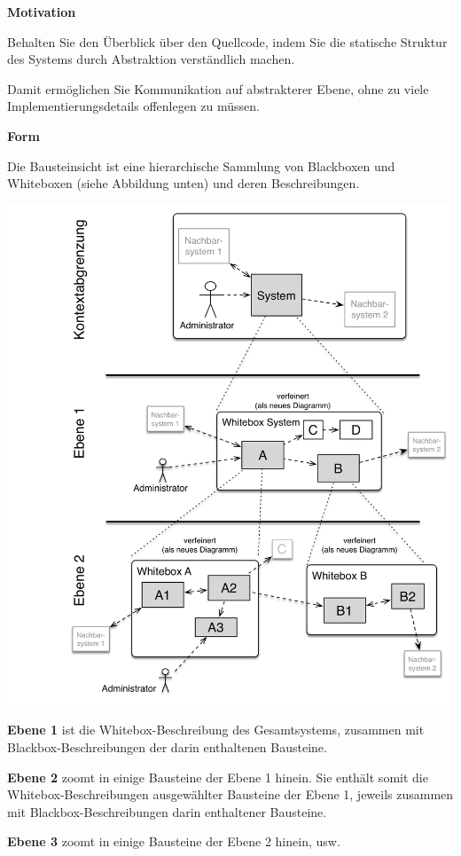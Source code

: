 \documentclass[
]{article}
\begin{document}
\textbf{Motivation}

Behalten Sie den Überblick über den Quellcode, indem Sie die statische
Struktur des Systems durch Abstraktion verständlich machen.

Damit ermöglichen Sie Kommunikation auf abstrakterer Ebene, ohne zu
viele Implementierungsdetails offenlegen zu müssen.

\textbf{Form}

Die Bausteinsicht ist eine hierarchische Sammlung von Blackboxen und
Whiteboxen (siehe Abbildung unten) und deren Beschreibungen.

\includegraphics{images/05_building_blocks-DE.png}

\textbf{Ebene 1} ist die Whitebox-Beschreibung des Gesamtsystems,
zusammen mit Blackbox-Beschreibungen der darin enthaltenen Bausteine.

\textbf{Ebene 2} zoomt in einige Bausteine der Ebene 1 hinein. Sie
enthält somit die Whitebox-Beschreibungen ausgewählter Bausteine der
Ebene 1, jeweils zusammen mit Blackbox-Beschreibungen darin enthaltener
Bausteine.

\textbf{Ebene 3} zoomt in einige Bausteine der Ebene 2 hinein, usw.
\end{document}
